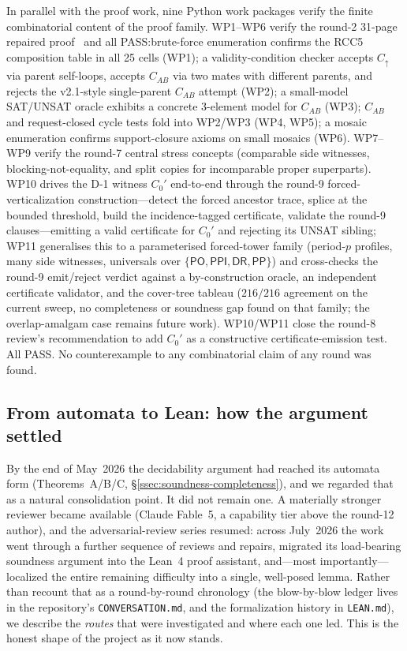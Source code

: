 \documentclass[
]{ceurart}
\theoremstyle{definition}
\newcommand{\DR}{\ensuremath{\mathsf{DR}}}
\newcommand{\PO}{\ensuremath{\mathsf{PO}}}
\newcommand{\PP}{\ensuremath{\mathsf{PP}}}
\newcommand{\PPI}{\ensuremath{\mathsf{PPI}}}
\begin{document}
In parallel with the proof work, nine Python work packages
verify the finite combinatorial content of the proof family.
WP1--WP6 verify the round-2 31-page repaired
proof~\cite{GPT55Repaired} and all PASS:\@ brute-force
enumeration confirms the RCC5 composition table in all 25
cells (WP1); a validity-condition checker accepts $C_\uparrow$
via parent self-loops, accepts $C_{AB}$ via two mates with
different parents, and rejects the v2.1-style single-parent
$C_{AB}$ attempt (WP2); a small-model SAT/UNSAT oracle exhibits
a concrete 3-element model for $C_{AB}$ (WP3); $C_{AB}$ and
request-closed cycle tests fold into WP2/WP3 (WP4, WP5); a
mosaic enumeration confirms support-closure axioms on small
mosaics (WP6).  WP7--WP9 verify the round-7 central stress
concepts (comparable side witnesses, blocking-not-equality, and
split copies for incomparable proper superparts).  WP10 drives the
D-1 witness $C_0'$ end-to-end through the round-9 forced-verticalization
construction---detect the forced ancestor trace, splice at the bounded
threshold, build the incidence-tagged certificate, validate the round-9
clauses---emitting a valid certificate for $C_0'$ and rejecting its
UNSAT sibling; WP11 generalises this to a parameterised forced-tower
family (period-$p$ profiles, many side witnesses, universals over
$\{\PO,\PPI,\DR,\PP\}$) and cross-checks the round-9 emit/reject verdict
against a by-construction oracle, an independent certificate validator,
and the cover-tree tableau ($216/216$ agreement on the current sweep,
no completeness or soundness gap found on that family; the
overlap-amalgam case remains future work).  WP10/WP11 close the
round-8 review's recommendation to add $C_0'$ as a constructive
certificate-emission test.  All PASS.  No counterexample to any
combinatorial claim of any round was found.

\subsection{From automata to Lean: how the argument settled}
\label{ssec:settled}

By the end of May~2026 the decidability argument had reached its
automata form (Theorems~A/B/C, \S\ref{ssec:soundness-completeness}), and
we regarded that as a natural consolidation point.  It did not remain
one.  A materially stronger reviewer became available (Claude
Fable~5, a capability tier above the round-12 author), and the
adversarial-review series resumed: across July~2026 the work went through
a further sequence of reviews and repairs, migrated its load-bearing
soundness argument into the Lean~4 proof assistant, and---most
importantly---localized the entire remaining difficulty into a single,
well-posed lemma.  Rather than recount that as a round-by-round
chronology (the blow-by-blow ledger lives in the repository's
\texttt{CONVERSATION.md}, and the formalization history in
\texttt{LEAN.md}), we describe the \emph{routes} that were investigated
and where each one led.  This is the honest shape of the project as it
now stands.
\end{document}
